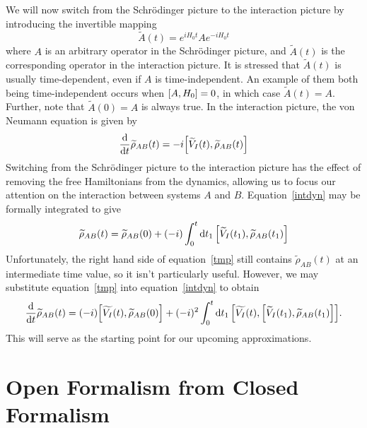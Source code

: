 \documentclass{article}
\newcommand{\til}[1]{\widetilde{#1}}
\begin{document}
We will now switch from the Schr{\"o}dinger picture to the interaction picture by introducing the invertible mapping
\begin{equation}\label{intpic}
\til{A}(t) = e^{iH_0t}Ae^{-iH_0t}
\end{equation}
where $A$ is an arbitrary operator in the Schr{\"o}dinger picture, and $\til{A}(t)$ is the corresponding operator in the interaction picture. It is stressed that $\til{A}(t)$ is usually time-dependent, even if $A$ is time-independent. An example of them both being time-independent occurs when $\comm{A}{H_0} = 0$, in which case $\til{A}(t) = A$. Further, note that $\til{A}(0) = A$ is always true. In the interaction picture, the von Neumann equation is given by
\begin{equation}\label{intdyn}
\dv{t}\til{\rho}_{AB}(t) = -i\comm{\til{V}_I(t)}{\til{\rho}_{AB}(t)}
\end{equation}
Switching from the Schr{\"o}dinger picture to the interaction picture has the effect of removing the free Hamiltonians from the dynamics, allowing us to focus our attention on the interaction between systems $A$ and $B$. Equation~\ref{intdyn} may be formally integrated to give
\begin{equation}\label{tmp}
\til{\rho}_{AB}(t) = \til{\rho}_{AB}(0) + (-i)\int_0^{t}\dd{t_1}\comm{\til{V}_I(t_1)}{\til{\rho}_{AB}(t_1)}
\end{equation}
Unfortunately, the right hand side of equation~\ref{tmp} still contains $\til{\rho}_{AB}(t)$ at an intermediate time value, so it isn't particularly useful. However, we may substitute equation~\ref{tmp} into equation~\ref{intdyn} to obtain
\begin{equation}\label{totintpert}
\dv{t}\til{\rho}_{AB}(t) = (-i)\comm{\til{V_I}(t)}{\til{\rho}_{AB}(0)} + (-i)^2\int_0^{t}\dd{t_1}\comm{\til{V_I}(t)}{\comm{\til{V}_I(t_1)}{\til{\rho}_{AB}(t_1)}}.
\end{equation}
This will serve as the starting point for our upcoming approximations.

\section{Open Formalism from Closed Formalism}
\end{document}
